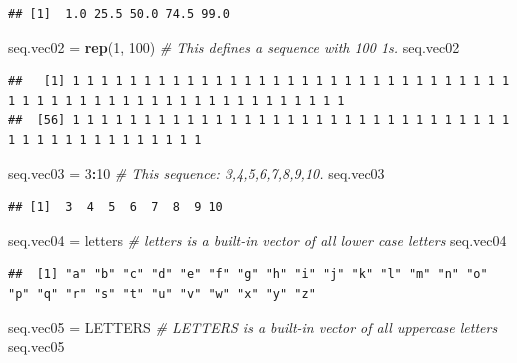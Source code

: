 \documentclass[
]{book}
\newenvironment{Shaded}{\begin{snugshade}}{\end{snugshade}}
\newcommand{\CommentTok}[1]{\textcolor[rgb]{0.56,0.35,0.01}{\textit{#1}}}
\newcommand{\DecValTok}[1]{\textcolor[rgb]{0.00,0.00,0.81}{#1}}
\newcommand{\FunctionTok}[1]{\textcolor[rgb]{0.13,0.29,0.53}{\textbf{#1}}}
\newcommand{\NormalTok}[1]{#1}
\newcommand{\OtherTok}[1]{\textcolor[rgb]{0.56,0.35,0.01}{#1}}
\newcommand{\SpecialCharTok}[1]{\textcolor[rgb]{0.81,0.36,0.00}{\textbf{#1}}}
\begin{document}
\begin{verbatim}
## [1]  1.0 25.5 50.0 74.5 99.0
\end{verbatim}

\begin{Shaded}
\begin{Highlighting}[]
\NormalTok{seq.vec02 }\OtherTok{=} \FunctionTok{rep}\NormalTok{(}\DecValTok{1}\NormalTok{, }\DecValTok{100}\NormalTok{)             }\CommentTok{\# This defines a sequence with 100 1s.}
\NormalTok{seq.vec02}
\end{Highlighting}
\end{Shaded}

\begin{verbatim}
##   [1] 1 1 1 1 1 1 1 1 1 1 1 1 1 1 1 1 1 1 1 1 1 1 1 1 1 1 1 1 1 1 1 1 1 1 1 1 1 1 1 1 1 1 1 1 1 1 1 1 1 1 1 1 1 1 1
##  [56] 1 1 1 1 1 1 1 1 1 1 1 1 1 1 1 1 1 1 1 1 1 1 1 1 1 1 1 1 1 1 1 1 1 1 1 1 1 1 1 1 1 1 1 1 1
\end{verbatim}

\begin{Shaded}
\begin{Highlighting}[]
\NormalTok{seq.vec03 }\OtherTok{=} \DecValTok{3}\SpecialCharTok{:}\DecValTok{10}                    \CommentTok{\# This sequence: 3,4,5,6,7,8,9,10.}
\NormalTok{seq.vec03}
\end{Highlighting}
\end{Shaded}

\begin{verbatim}
## [1]  3  4  5  6  7  8  9 10
\end{verbatim}

\begin{Shaded}
\begin{Highlighting}[]
\NormalTok{seq.vec04 }\OtherTok{=}\NormalTok{ letters                 }\CommentTok{\# letters is a built{-}in vector of all lower case letters    }
\NormalTok{seq.vec04}
\end{Highlighting}
\end{Shaded}

\begin{verbatim}
##  [1] "a" "b" "c" "d" "e" "f" "g" "h" "i" "j" "k" "l" "m" "n" "o" "p" "q" "r" "s" "t" "u" "v" "w" "x" "y" "z"
\end{verbatim}

\begin{Shaded}
\begin{Highlighting}[]
\NormalTok{seq.vec05 }\OtherTok{=}\NormalTok{ LETTERS                 }\CommentTok{\# LETTERS is a built{-}in vector of all uppercase letters}
\NormalTok{seq.vec05}
\end{Highlighting}
\end{Shaded}
\end{document}
